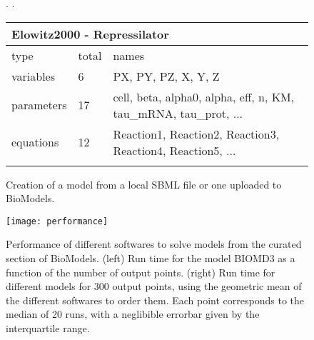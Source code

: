   
  \begin{figure*}[t]
    \centering
    
    \begin{CodeInput}
    \begin{Highlighting}[]
  
    \OperatorTok{=}.\KeywordTok{(}\KeywordTok{)}  
    \OperatorTok{=}.\KeywordTok{(}\KeywordTok{)}  
    \end{Highlighting}
    \end{CodeInput}
      
    \begin{CodeOutput}
        \begin{tabular}{@{}lll@{}}
            \multicolumn{3}{l}{Elowitz2000 - Repressilator} \\
            \toprule
            type & total & names \\
            \midrule
            variables  &  6 & PX, PY, PZ, X, Y, Z \\
            parameters & 17 & cell, beta, alpha0, alpha, eff, n, KM, tau\_mRNA, tau\_prot, ... \\
            equations  & 12 & Reaction1, Reaction2, Reaction3, Reaction4, Reaction5, ... \\
            \botrule
        \end{tabular}
    \end{CodeOutput}
    
    \caption{Creation of a model from a local SBML file or one uploaded to BioModels.}
    \label{fig-simbio-io}
  \end{figure*}
    
  \begin{figure*}[t]
    \centering
    \texttt{[image: performance]}
    \caption{
      Performance of different softwares to solve models from the curated section of BioModels.
      (left) Run time for the model BIOMD3 as a function of the number of output points.
      (right) Run time for different models for 300 output points,
      using the geometric mean of the different softwares to order them.
      Each point corresponds to the median of 20 runs,
      with a neglibible errorbar given by the interquartile range.
    }
    \label{fig-runtime}
  \end{figure*}
  
